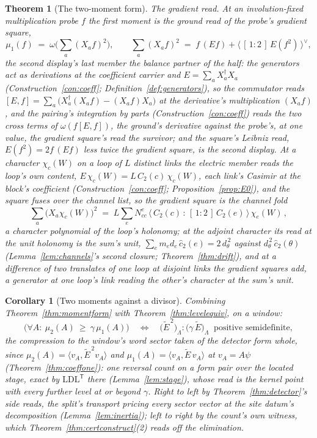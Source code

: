 \documentclass[11pt]{article}
\newtheorem{theorem}{Theorem}
\newtheorem{corollary}{Corollary}
\theoremstyle{definition}
\begin{document}
\begin{theorem}[The two-moment form]
\emph{The gradient read.} At an involution-fixed multiplication
probe $f$ the first moment is the ground read of the probe's
gradient square,
\[
\mu_1(f)\;=\;\omega\Big(\sum_a(X_af)^2\Big),
\qquad
\sum_a(X_af)^2\;=\;f\,(Ef)+\big\langle\,[\,1:2\,]\,E(f^2)\,\big\rangle^{\!\vee},
\]
the second display's last member the balance partner of the half:
the generators act as derivations at the coefficient carrier and
$E=\sum_aX_a^{\dagger}X_a$ (Construction~\ref{con:coeff};
Definition~\ref{def:generators}), so the commutator reads
$[E,f]=\sum_a\big(X_a^{\dagger}(X_af)-(X_af)X_a\big)$ at the
derivative's multiplication $(X_af)$, and the pairing's
integration by parts (Construction~\ref{con:coeff}) reads the two
cross terms of $\omega(f[E,f])$, the ground's derivative against
the probe's, at one value, the gradient square's read the
survivor; and the square's Leibniz read,
$E(f^2)=2f\,(Ef)$ less twice the gradient square, is the second
display. At a character $\chi_c(W)$ on a loop of $L$ distinct
links the electric member reads the loop's own content,
$E\,\chi_c(W)=L\,C_2(c)\,\chi_c(W)$, each link's Casimir at the
block's coefficient (Construction~\ref{con:coeff};
Proposition~\ref{prop:E0}), and the square fuses over the
channel list, so the gradient square is the \emph{channel fold}
\[
\sum_a\big(X_a\chi_c(W)\big)^2
\;=\;L\sum_eN^e_{cc}\,
\big\langle\,C_2(c)\,:\,[\,1:2\,]\,C_2(e)\,\big\rangle\,\chi_e(W)\,,
\]
a character polynomial of the loop's holonomy; at the adjoint
character its read at the unit holonomy is the sum's unit,
$\sum_em_ed_e\,\hat c_2(e)=2\,d_\theta^{\,2}$ against
$d_\theta^{\,2}\,\hat c_2(\theta)$ (Lemma~\ref{lem:channels}'s
second closure; Theorem~\ref{thm:drift}), and at a difference of
two translates of one loop at disjoint links the gradient squares
add, a generator at one loop's link reading the other's character
at the sum's unit.
\end{theorem}

\begin{corollary}[Two moments against a divisor]
\label{cor:momentdivisor}
Combining Theorem~\ref{thm:momentform} with Theorem~\ref{thm:levelequiv}, on a
window:
\[
\big(\forall A:\ \mu_2(A)\ \ge\ \gamma\,\mu_1(A)\big)
\quad\Longleftrightarrow\quad
\big(\tilde E^{\,2}\big)_\Lambda:\big(\gamma\,\tilde E\big)_\Lambda
\ \text{ positive semidefinite},
\]
the compression to the window's word sector taken of the detector form
whole, since $\mu_2(A)=\langle v_A,\tilde E^{\,2}v_A\rangle$ and
$\mu_1(A)=\langle v_A,\tilde E\,v_A\rangle$ at $v_A=A\psi$
(Theorem~\ref{thm:coeffone}): one reversal count on a form pair over
the located stage, exact by $\mathrm{LDL}^{\mathsf T}$ there
(Lemma~\ref{lem:stage}), whose read is
the kernel point with every further level at or beyond $\gamma$.
Right to left by Theorem~\ref{thm:detector}'s side reads, the
split's transport pricing every sector vector at the site datum's
decomposition (Lemma~\ref{lem:inertia}); left to right by the count's own
witness, which Theorem~\ref{thm:certconstruct}(2) reads off the elimination.
\end{corollary}
\end{document}
